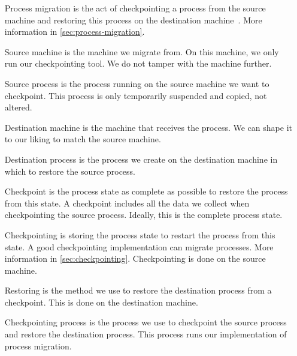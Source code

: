 \documentclass[a4paper, 11pt, english]{report}
\begin{document}
\begin{itemize}[font=\textbf,leftmargin=2.7cm]
	\item[Process migration] is the act of checkpointing a process from the source machine and restoring this process on the destination machine~\cite{process-migration}. More information in \autoref{sec:process-migration}.
	\item[Source machine] is the machine we migrate from. On this machine, we only run our checkpointing tool. We do not tamper with the machine further.
	\item[Source process] is the process running on the source machine we want to checkpoint. This process is only temporarily suspended and copied, not altered.
	\item[Destination machine] is the machine that receives the process. We can shape it to our liking to match the source machine.
	\item[Destination process] is the process we create on the destination machine in which to restore the source process.
	\item[Checkpoint] is the process state as complete as possible to restore the process from this state. A checkpoint includes all the data we collect when checkpointing the source process. Ideally, this is the complete process state.
	\item[Checkpointing] is storing the process state to restart the process from this state. A good checkpointing implementation can migrate processes. More information in \autoref{sec:checkpointing}. Checkpointing is done on the source machine.
	\item[Restoring] is the method we use to restore the destination process from a checkpoint. This is done on the destination machine.
	\item[Checkpointing process] is the process we use to checkpoint the source process and restore the destination process. This process runs our implementation of process migration.
\end{itemize}

\end{document}
